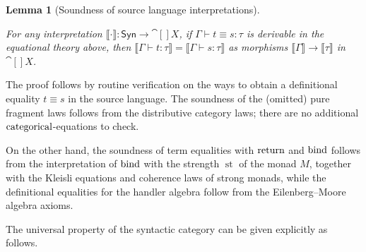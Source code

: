\documentclass[11pt,a4paper]{article}
\newtheorem{lemma}[theorem]{Lemma}
\theoremstyle{definition}
\theoremstyle{remark}
\providecommand{\Syn}{\mathsf{Syn}}
\providecommand{\genint}[1]{\llbracket #1\rrbracket}
\providecommand{\str}{\operatorname{st}}
\begin{document}
\begin{lemma}[Soundness of source language interpretations]
  \label{lem:appendix-soundness-of-source-language-interpretations}

  For any interpretation \( \genint{\cdot}: \Syn \to \cat[]{X} \), if \( \Gamma \vdash t \equiv s : \tau \) is derivable in the equational theory above, then \( \genint{\Gamma \vdash t : \tau} = \genint{\Gamma \vdash s : \tau} \) as morphisms \( \genint{\Gamma} \to \genint{\tau} \) in \( \cat[]{X} \).
\end{lemma}

The proof follows by routine verification on the ways to obtain a definitional equality \( t \equiv s \) in the source language. The soundness of the (omitted) pure fragment laws follows from the distributive category laws; there are no additional \( \opn[b]{categorical} \)-equations to check.

On the other hand, the soundness of term equalities with \( \opn[b]{return} \) and \( \opn[b]{bind} \) follows from the interpretation of \( \opn[b]{bind} \) with the strength \( \str \) of the monad \( M \), together with the Kleisli equations and coherence laws of strong monads, while the definitional equalities for the handler algebra follow from the Eilenberg--Moore algebra axioms.

The universal property of the syntactic category can be given explicitly as follows.
\end{document}
